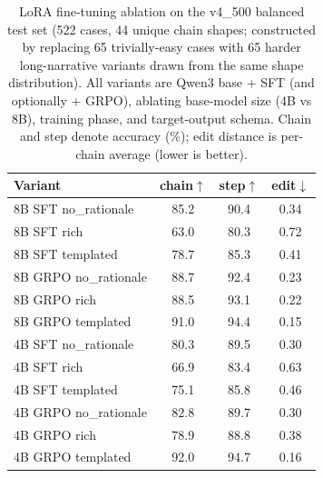 \begin{table}[!ht]
\centering
\caption{LoRA fine-tuning ablation on the v4\_500 balanced test set (522 cases, 44 unique chain shapes; constructed by replacing 65 trivially-easy cases with 65 harder long-narrative variants drawn from the same shape distribution). All variants are Qwen3 base + SFT (and optionally + GRPO), ablating base-model size (4B vs 8B), training phase, and target-output schema. Chain and step denote accuracy (\%); edit distance is per-chain average (lower is better).}
\label{tab:director_routing_lora_ablation}
\small
\setlength{\tabcolsep}{8pt}
\begin{tabular}{l|ccc}
\toprule
Variant & chain$\uparrow$ & step$\uparrow$ & edit$\downarrow$ \\
\midrule
8B SFT no\_rationale & 85.2 & 90.4 & 0.34 \\
8B SFT rich & 63.0 & 80.3 & 0.72 \\
8B SFT templated & 78.7 & 85.3 & 0.41 \\
8B GRPO no\_rationale & 88.7 & 92.4 & 0.23 \\
8B GRPO rich & 88.5 & 93.1 & 0.22 \\
8B GRPO templated & 91.0 & 94.4 & 0.15 \\
\midrule
4B SFT no\_rationale & 80.3 & 89.5 & 0.30 \\
4B SFT rich & 66.9 & 83.4 & 0.63 \\
4B SFT templated & 75.1 & 85.8 & 0.46 \\
4B GRPO no\_rationale & 82.8 & 89.7 & 0.30 \\
4B GRPO rich & 78.9 & 88.8 & 0.38 \\
4B GRPO templated & 92.0 & 94.7 & 0.16 \\
\bottomrule
\end{tabular}
\end{table}
